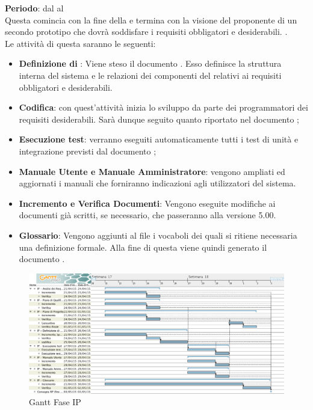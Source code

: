 	\textbf{Periodo}: dal  al  \\Questa {} comincia con la fine della  e termina con la visione del proponente di un secondo prototipo che dovrà soddisfare i requisiti obbligatori e desiderabili. .\\Le attività di questa  saranno le seguenti:
	\begin{itemize}
		\item\textbf{Definizione di }: Viene steso il documento . Esso definisce la struttura interna del sistema e le relazioni dei componenti del  relativi ai requisiti obbligatori e desiderabili.
		\item \textbf{Codifica}: con quest'attività inizia lo sviluppo da parte dei programmatori dei requisiti desiderabili. Sarà dunque seguito quanto riportato nel documento ;
		\item \textbf{Esecuzione test}: verranno eseguiti automaticamente tutti i test di unità e integrazione previsti dal documento ;
		\item\textbf{Manuale Utente e Manuale Amministratore}: vengono ampliati ed aggiornati i manuali che forniranno indicazioni agli utilizzatori del sistema.
		\item\textbf{Incremento e Verifica Documenti}: Vengono eseguite modifiche ai documenti già scritti, se necessario, che passeranno alla versione 5.00.
		\item\textbf{Glossario}: Vengono aggiunti al file  i vocaboli dei quali si ritiene necessaria una definizione formale. Alla fine di questa  viene quindi generato il documento .
	\end{itemize}
	\begin{figure}[H]\centering
		\includegraphics[width=\textwidth]{PianoDiProgetto/Pics/FaseIP.png}
	\caption{Gantt Fase IP}
\end{figure}
